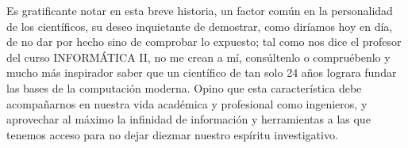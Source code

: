 \documentclass{article}
\begin{document}
\begin{multicols}{2}
        \vspace{\baselineskip}
        
        Es gratificante notar en esta breve historia, un factor común en la personalidad de los científicos, su deseo inquietante de demostrar, como diríamos hoy en día, de no dar por hecho sino de comprobar lo expuesto; tal como nos dice el profesor del curso INFORMÁTICA II, {no me crean a mí, consúltenlo o compruébenlo} y mucho más inspirador saber que un científico de tan solo 24 años lograra fundar las bases de la computación moderna.  Opino que esta característica debe acompañarnos en nuestra vida académica y profesional como ingenieros, y aprovechar al máximo la infinidad de información y herramientas a las que tenemos acceso para no dejar diezmar nuestro espíritu investigativo.
        
        \printbibliography
    
\end{multicols}
\end{document}
